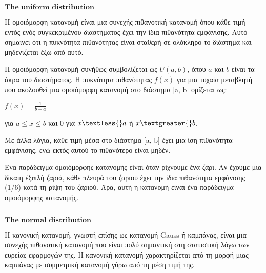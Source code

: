 \documentclass[11pt]{article}
\makeatletter
\newcommand{\boxspacing}{\kern\kvtcb@left@rule\kern\kvtcb@boxsep}
\newcommand{\prompt}[4]{
        {\ttfamily\llap{{\color{#2}[#3]:\hspace{3pt}#4}}\vspace{-\baselineskip}}
    }
\makeatother
\begin{document}
    \begin{tcolorbox}[breakable, size=fbox, boxrule=1pt, pad at break*=1mm,colback=cellbackground, colframe=cellborder]
\prompt{In}{incolor}{ }{\boxspacing}
\begin{Verbatim}[commandchars=\\\{\}]

\end{Verbatim}
\end{tcolorbox}

    \(\textbf{The uniform distribution}\)

    Η ομοιόμορφη κατανομή είναι μια συνεχής πιθανοτική κατανομή όπου κάθε
τιμή εντός ενός συγκεκριμένου διαστήματος έχει την ίδια πιθανότητα
εμφάνισης. Αυτό σημαίνει ότι η πυκνότητα πιθανότητας είναι σταθερή σε
ολόκληρο το διάστημα και μηδενίζεται έξω από αυτό.

Η ομοιόμορφη κατανομή συνήθως συμβολίζεται ως $ U(a, b) $, όπου $ a
$ και $ b $ είναι τα άκρα του διαστήματος. Η πυκνότητα πιθανότητας $
f(x) $ για μια τυχαία μεταβλητή που ακολουθεί μια ομοιόμορφη κατανομή
στο διάστημα {[}a, b{]} ορίζεται ως:

$ f(x) = \frac{1}{b - a} $

για $ a \leq x \leq b $ και $ 0 $ για $ x \textless{} a $ ή $ x
\textgreater{} b $.

Με άλλα λόγια, κάθε τιμή μέσα στο διάστημα {[}a, b{]} έχει μια ίση
πιθανότητα εμφάνισης, ενώ εκτός αυτού το πιθανότερο είναι μηδέν.

Ένα παράδειγμα ομοιόμορφης κατανομής είναι όταν ρίχνουμε ένα ζάρι. Αν
έχουμε μια δίκαιη έξιπλή ζαριά, κάθε πλευρά του ζαριού έχει την ίδια
πιθανότητα εμφάνισης (1/6) κατά τη ρίψη του ζαριού. Άρα, αυτή η κατανομή
είναι ένα παράδειγμα ομοιόμορφης κατανομής.

    \begin{tcolorbox}[breakable, size=fbox, boxrule=1pt, pad at break*=1mm,colback=cellbackground, colframe=cellborder]
\prompt{In}{incolor}{ }{\boxspacing}
\begin{Verbatim}[commandchars=\\\{\}]

\end{Verbatim}
\end{tcolorbox}

    \(\textbf{The normal distribution}\)

    Η κανονική κατανομή, γνωστή επίσης ως κατανομή Gauss ή καμπάνας, είναι
μια συνεχής πιθανοτική κατανομή που είναι πολύ σημαντική στη στατιστική
λόγω των ευρείας εφαρμογών της. Η κανονική κατανομή χαρακτηρίζεται από
τη μορφή μιας καμπάνας με συμμετρική κατανομή γύρω από τη μέση τιμή της.
\end{document}
